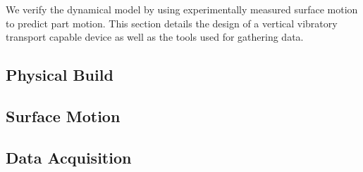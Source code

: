 
We verify the dynamical model by using experimentally measured surface motion to predict part motion. 
%
This section details the design of a vertical vibratory transport capable device as well as the tools used for gathering data.

\subsection{Physical Build}



\subsection{Surface Motion}



\subsection{Data Acquisition}

